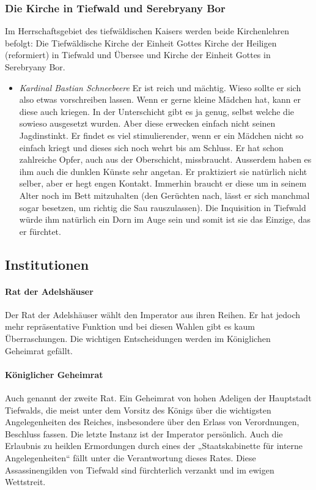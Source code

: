\documentclass[10pt,twoside,twocolumn,openany]{book}
\begin{document}
\begin{multicols}{2}
	\subsubsection{Die Kirche in Tiefwald und Serebryany Bor}
	
	Im Herrschaftsgebiet des tiefwäldischen Kaisers werden beide Kirchenlehren befolgt: Die Tiefwäldische Kirche der Einheit Gottes Kirche der Heiligen (reformiert) in Tiefwald und Übersee und Kirche der Einheit Gottes in Serebryany Bor.
	
	\begin{itemize}
		\item\textit{Kardinal Bastian Schneebeere} Er ist reich und mächtig. Wieso sollte er sich also etwas vorschreiben lassen. Wenn er gerne kleine Mädchen hat, kann er diese auch kriegen. In der Unterschicht gibt es ja genug, selbst welche die sowieso ausgesetzt wurden. Aber diese erwecken einfach nicht seinen Jagdinstinkt. Er findet es viel stimulierender, wenn er ein Mädchen nicht so einfach kriegt und dieses sich noch wehrt bis am Schluss. Er hat schon zahlreiche Opfer, auch aus der Oberschicht, missbraucht.
		Ausserdem haben es ihm auch die dunklen Künste sehr angetan. Er praktiziert sie natürlich nicht selber, aber er hegt engen Kontakt. Immerhin braucht er diese um in seinem Alter noch im Bett mitzuhalten (den Gerüchten nach, lässt er sich manchmal sogar besetzen, um richtig die Sau rauszulassen).
		Die Inquisition in Tiefwald würde ihm natürlich ein Dorn im Auge sein und somit ist sie das Einzige, das er fürchtet.
	\end{itemize}
	
	\subsection{Institutionen}
	
	\paragraph{Rat der Adelshäuser}
	Der Rat der Adelshäuser wählt den Imperator aus ihren Reihen. Er hat jedoch mehr repräsentative Funktion und bei diesen Wahlen gibt es kaum Überraschungen. Die wichtigen Entscheidungen werden im Königlichen Geheimrat gefällt.
	
	\paragraph{Königlicher Geheimrat} Auch genannt der zweite Rat. Ein Geheimrat von hohen Adeligen der Hauptstadt Tiefwalds, die meist unter dem Vorsitz des Königs über die wichtigsten Angelegenheiten des Reiches, insbesondere über den Erlass von Verordnungen, Beschluss fassen. Die letzte Instanz ist der Imperator persönlich. Auch die Erlaubnis zu heiklen Ermordungen durch eines der „Staatskabinette für interne Angelegenheiten“ fällt unter die Verantwortung dieses Rates. Diese Assassinengilden von Tiefwald sind fürchterlich verzankt und im ewigen Wettstreit.
	

\end{multicols}
\end{document}
